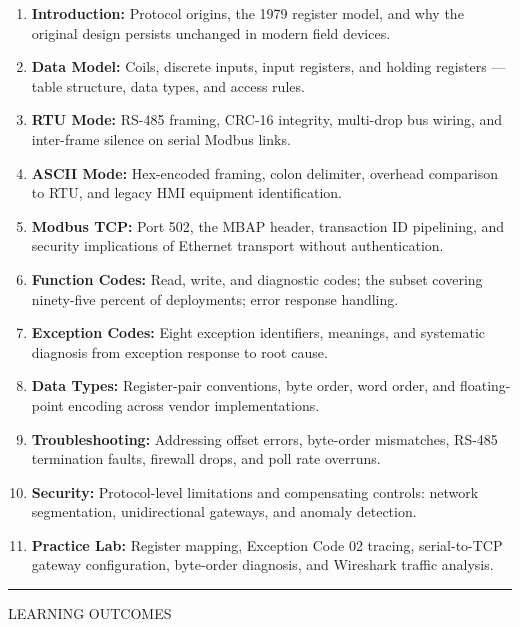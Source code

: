 \documentclass[10pt]{article}
\begin{document}
\begin{enumerate}\small
  \item \textbf{Introduction:} Protocol origins, the 1979 register model, and why the original design persists unchanged in modern field devices.
  \item \textbf{Data Model:} Coils, discrete inputs, input registers, and holding registers — table structure, data types, and access rules.
  \item \textbf{RTU Mode:} RS-485 framing, CRC-16 integrity, multi-drop bus wiring, and inter-frame silence on serial Modbus links.
  \item \textbf{ASCII Mode:} Hex-encoded framing, colon delimiter, overhead comparison to RTU, and legacy HMI equipment identification.
  \item \textbf{Modbus TCP:} Port 502, the MBAP header, transaction ID pipelining, and security implications of Ethernet transport without authentication.
  \item \textbf{Function Codes:} Read, write, and diagnostic codes; the subset covering ninety-five percent of deployments; error response handling.
  \item \textbf{Exception Codes:} Eight exception identifiers, meanings, and systematic diagnosis from exception response to root cause.
  \item \textbf{Data Types:} Register-pair conventions, byte order, word order, and floating-point encoding across vendor implementations.
  \item \textbf{Troubleshooting:} Addressing offset errors, byte-order mismatches, RS-485 termination faults, firewall drops, and poll rate overruns.
  \item \textbf{Security:} Protocol-level limitations and compensating controls: network segmentation, unidirectional gateways, and anomaly detection.
  \item \textbf{Practice Lab:} Register mapping, Exception Code 02 tracing, serial-to-TCP gateway configuration, byte-order diagnosis, and Wireshark traffic analysis.
\end{enumerate}

\smallskip
{\color{mnavy}\rule{\linewidth}{0.4pt}}
\smallskip
{\small\sffamily\color{mgray}\MakeUppercase{Learning Outcomes}}
\smallskip
\end{document}
